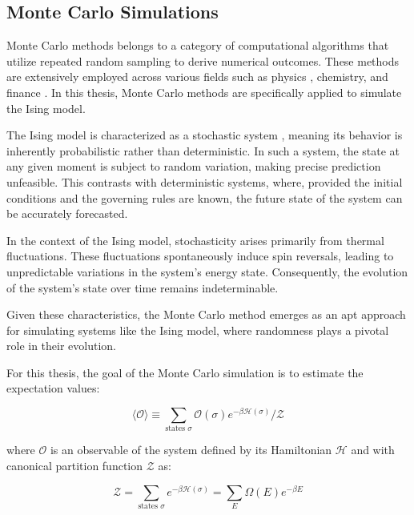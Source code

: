 \subsection{Monte Carlo Simulations}
\label{sec:montecarlo}

Monte Carlo methods belongs to a category of computational algorithms that
utilize repeated random sampling to derive numerical outcomes. These methods are
extensively employed across various fields such as physics \cite{Landau2021},
chemistry, \cite{Andersen2019} and finance \cite{Glasserman2008}. In this
thesis, Monte Carlo methods are specifically applied to simulate the Ising
model.

The Ising model is characterized as a stochastic system \cite{Cinlar1975},
meaning its behavior is inherently probabilistic rather than deterministic. In
such a system, the state at any given moment is subject to random variation,
making precise prediction unfeasible. This contrasts with deterministic systems,
where, provided the initial conditions and the governing rules are known, the
future state of the system can be accurately forecasted.

In the context of the Ising model, stochasticity arises primarily from thermal
fluctuations. These fluctuations spontaneously induce spin reversals, leading to
unpredictable variations in the system's energy state. Consequently, the
evolution of the system's state over time remains indeterminable.

Given these characteristics, the Monte Carlo method emerges as an apt approach
for simulating systems like the Ising model, where randomness plays a pivotal
role in their evolution.

For this thesis, the goal of the Monte Carlo simulation is to estimate the
expectation values:

\begin{equation}
\langle \mathcal{O} \rangle \equiv \sum_{\text{states } \sigma} \mathcal{O}(\sigma) e^{-\beta \mathcal{H}(\sigma)} / \mathcal{Z}
\end{equation}

where $\mathcal{O}$ is an observable of the system defined by its Hamiltonian
$\mathcal{H}$ and with canonical partition function $\mathcal{Z}$ as:

\begin{equation}
\mathcal{Z} = \sum_{\text{states } \sigma} e^{-\beta \mathcal{H}(\sigma)} = \sum_{E} \Omega(E) e^{-\beta E}
\end{equation}

